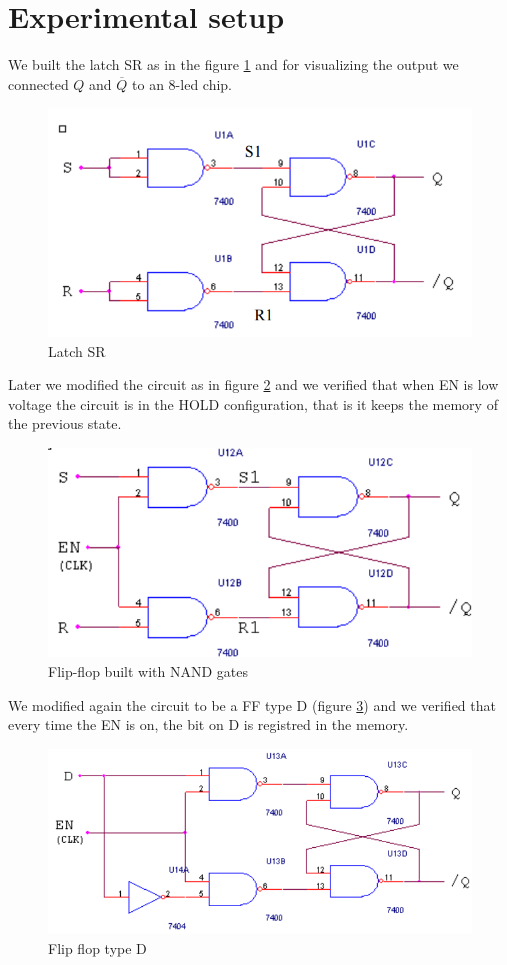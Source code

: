 \section{Experimental setup}
We built the latch SR as in the figure \ref{SR_NAND} and for visualizing the output we  connected $Q$ and $\overline{Q}$ to an 8-led chip.
\begin{figure}[H]
\centering
\includegraphics[width=.7\textwidth]{11/SR_NAND.png}
\caption{Latch SR}\label{SR_NAND}
\end{figure}
Later we modified the circuit as in figure \ref{FF_SR_NAND} and we verified that when EN is low voltage the circuit is in the HOLD configuration, that is it keeps the memory of the previous state. 
\begin{figure}[H]
\centering
\includegraphics[width=.7\textwidth]{11/FF_SR_NAND.png}
\caption{Flip-flop built with NAND gates}\label{FF_SR_NAND}

\end{figure}
We modified again the circuit to be a FF type D (figure \ref{D_FF}) and we verified that every time the EN is on, the bit on D is registred in the memory.
\begin{figure}[H]
\centering
\includegraphics[width=.7\textwidth]{11/D_FF.png}
\caption{Flip flop type D}\label{D_FF}

\end{figure}

